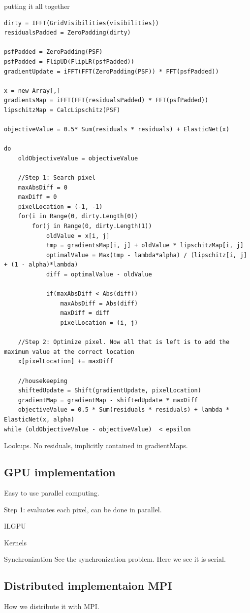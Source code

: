 putting it all together
\begin{lstlisting}
dirty = IFFT(GridVisibilities(visibilities))
residualsPadded = ZeroPadding(dirty)

psfPadded = ZeroPadding(PSF)
psfPadded = FlipUD(FlipLR(psfPadded))
gradientUpdate = iFFT(FFT(ZeroPadding(PSF)) * FFT(psfPadded))

x = new Array[,]
gradientsMap = iFFT(FFT(residualsPadded) * FFT(psfPadded))
lipschitzMap = CalcLipschitz(PSF)

objectiveValue = 0.5* Sum(residuals * residuals) + ElasticNet(x)

do 
	oldObjectiveValue = objectiveValue
	
	//Step 1: Search pixel
	maxAbsDiff = 0
	maxDiff = 0
	pixelLocation = (-1, -1)
	for(i in Range(0, dirty.Length(0))
		for(j in Range(0, dirty.Length(1))
			oldValue = x[i, j]
			tmp = gradientsMap[i, j] + oldValue * lipschitzMap[i, j]
			optimalValue = Max(tmp - lambda*alpha) / (lipschitz[i, j] + (1 - alpha)*lambda)
			diff = optimalValue - oldValue
			
			if(maxAbsDiff < Abs(diff))
				maxAbsDiff = Abs(diff)
				maxDiff = diff
				pixelLocation = (i, j)
	
	//Step 2: Optimize pixel. Now all that is left is to add the maximum value at the correct location
	x[pixelLocation] += maxDiff
	
	//housekeeping
	shiftedUpdate = Shift(gradientUpdate, pixelLocation)
	gradientMap = gradientMap - shiftedUpdate * maxDiff
	objectiveValue = 0.5 * Sum(residuals * residuals) + lambda * ElasticNet(x, alpha)
while (oldObjectiveValue - objectiveValue)  < epsilon
\end{lstlisting}


Lookups. No residuals, implicitly contained in gradientMaps.


\subsection{GPU implementation}
Easy to use parallel computing.

Step 1: evaluates each pixel, can be done in parallel.


ILGPU

Kernels

Synchronization
See the synchronization problem. Here we see it is serial.


\subsection{Distributed implementaion MPI}
How we distribute it with MPI.

